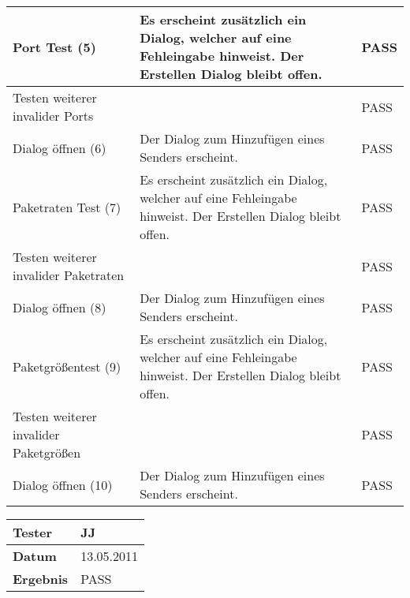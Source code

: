 \begin{table}[h]
\begin{center}
\begin{tabular}{|p{4cm}|p{7.8cm}|p{2.3cm}|}
\hline
Port Test (5) & Es erscheint zusätzlich ein Dialog, welcher auf eine Fehleingabe
 hinweist. Der Erstellen Dialog bleibt offen. & PASS
\\
\hline
Testen weiterer invalider Ports & & PASS
\\
\hline
Dialog öffnen (6) & Der Dialog
 zum Hinzufügen eines Senders erscheint. & PASS
\\
\hline
Paketraten Test (7) & Es erscheint zusätzlich ein Dialog, welcher auf eine Fehleingabe
 hinweist. Der Erstellen Dialog bleibt offen. & PASS
\\
\hline
Testen weiterer invalider Paketraten & & PASS
\\
\hline
Dialog öffnen (8) & Der Dialog
 zum Hinzufügen eines Senders erscheint. & PASS
\\
\hline
Paketgrößentest (9) & Es erscheint zusätzlich ein Dialog, welcher auf eine Fehleingabe
 hinweist. Der Erstellen Dialog bleibt offen. & PASS
\\
\hline
Testen weiterer invalider Paketgrößen & & PASS
\\
\hline
Dialog öffnen (10) & Der Dialog
 zum Hinzufügen eines Senders erscheint. & PASS
\\
\hline
\end{tabular}
\begin{tabular}{|p{3.5cm}|p{11cm}|}
\textbf{Tester} & JJ\\
\hline
\textbf{Datum} & 13.05.2011\\
\hline
\textbf{Ergebnis} & PASS\\
\hline
\end{tabular}
\end{center}
\end{table}